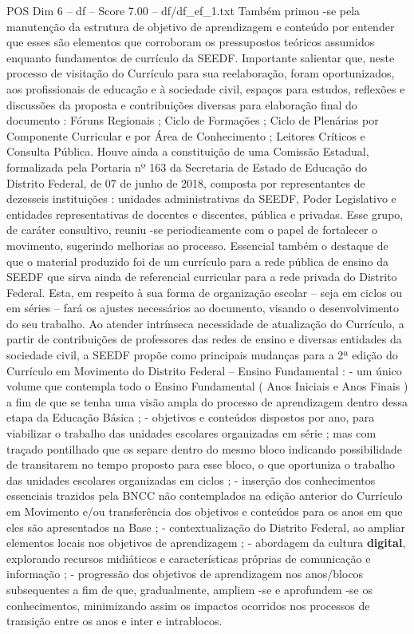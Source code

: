 \begin{textsample}{POS Dim 6 – df – Score 7.00 – df/df\_ef\_1.txt}
Também primou -se pela manutenção da estrutura de objetivo de aprendizagem e conteúdo por entender que esses são elementos que corroboram os pressupostos teóricos assumidos enquanto fundamentos de currículo da SEEDF.
Importante salientar que, neste processo de visitação do Currículo para sua reelaboração, foram oportunizados, aos profissionais de educação e à sociedade civil, espaços para estudos, reflexões e discussões da proposta e contribuições diversas para elaboração final do documento : Fóruns Regionais ; Ciclo de Formações ; Ciclo de Plenárias por Componente Curricular e por Área de Conhecimento ; Leitores Críticos e Consulta Pública.
Houve ainda a constituição de uma Comissão Estadual, formalizada pela Portaria nº 163 da Secretaria de Estado de Educação do Distrito Federal, de 07 de junho de 2018, composta por representantes de dezesseis instituições : unidades administrativas da SEEDF, Poder Legislativo e entidades representativas de docentes e discentes, pública e privadas.
Esse grupo, de caráter consultivo, reuniu -se periodicamente com o papel de fortalecer o movimento, sugerindo melhorias ao processo.
Essencial também o destaque de que o material produzido foi de um currículo para a rede pública de ensino da SEEDF que sirva ainda de referencial curricular para a rede privada do Distrito Federal.
Esta, em respeito à sua forma de organização escolar – seja em ciclos ou em séries – fará os ajustes necessários ao documento, visando o desenvolvimento do seu trabalho.
Ao atender intrínseca necessidade de atualização do Currículo, a partir de contribuições de professores das redes de ensino e diversas entidades da sociedade civil, a SEEDF propõe como principais mudanças para a 2ª edição do Currículo em Movimento do Distrito Federal – Ensino Fundamental : - um único volume que contempla todo o Ensino Fundamental ( Anos Iniciais e Anos Finais ) a fim de que se tenha uma visão ampla do processo de aprendizagem dentro dessa etapa da Educação Básica ; - objetivos e conteúdos dispostos por ano, para viabilizar o trabalho das unidades escolares organizadas em série ; mas com traçado pontilhado que os separe dentro do mesmo bloco indicando possibilidade de transitarem no tempo proposto para esse bloco, o que oportuniza o trabalho das unidades escolares organizadas em ciclos ; - inserção dos conhecimentos essenciais trazidos pela BNCC não contemplados na edição anterior do Currículo em Movimento e/ou transferência dos objetivos e conteúdos para os anos em que eles são apresentados na Base ; - contextualização do Distrito Federal, ao ampliar elementos locais nos objetivos de aprendizagem ; - abordagem da cultura \textbf{digital}, explorando recursos midiáticos e características próprias de comunicação e informação ; - progressão dos objetivos de aprendizagem nos anos/blocos subsequentes a fim de que, gradualmente, ampliem -se e aprofundem -se os conhecimentos, minimizando assim os impactos ocorridos nos processos de transição entre os anos e inter e intrablocos.

\end{textsample}
